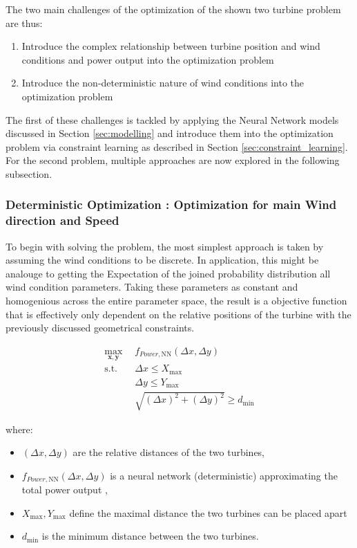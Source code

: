 The two main challenges of the optimization of the shown two turbine problem are thus: 

\begin{enumerate}
	\item Introduce the complex relationship between turbine position and wind conditions and power output into the optimization problem
	\item Introduce the non-deterministic nature of wind conditions into the optimization problem
\end{enumerate}

The first of these challenges is tackled by applying the Neural Network models discussed in Section \ref{sec:modelling} and introduce them into the optimization problem via constraint learning as described in Section \ref{sec:constraint_learning}. For the second problem, multiple approaches are now explored in the following subsection.


\subsubsection{Deterministic Optimization : Optimization for main Wind direction and Speed}

To begin with solving the problem, the most simplest approach is taken by assuming the wind conditions to be discrete. In application, this might be analouge to getting the Expectation of the joined probability distribution all wind condition parameters. Taking these parameters as constant and homogenious across the entire parameter space, the result is a objective function that is effectively only dependent on the relative positions of the turbine with the previously discussed geometrical constraints.

\begin{align}
	\max_{\mathbf{x}, \mathbf{y}} & f_{Power,\text{NN}}(\Delta x, \Delta y) \\
	\text{s.t.} \quad 
	&  \Delta x \leq X_{\max} \\
	&  \Delta y \leq Y_{\max} \\
	& \sqrt{(\Delta x)^2 + (\Delta y)^2} \geq d_{\min}
\end{align}

where:
\begin{itemize}
	\item \( (\Delta x, \Delta y) \) are the relative distances of the two turbines,
	\item \( f_{Power, \text{NN}}(\Delta x, \Delta y)\) is a neural network (deterministic) approximating the total power output ,
	\item \(  X_{\max}, Y_{\max} \) define the maximal distance the two turbines can be placed apart
	\item \( d_{\min} \) is the minimum distance between the two turbines.
\end{itemize}


